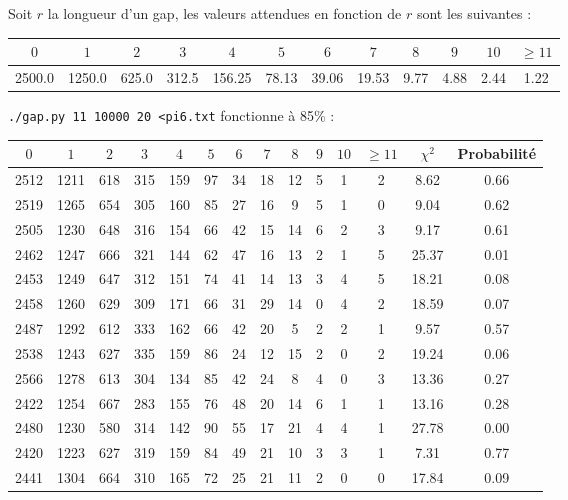 \documentclass[12pt,a4paper]{article}
\begin{document}
Soit $r$ la longueur d'un gap, les valeurs attendues en fonction de $r$ sont les suivantes : 
\begin{center}
\begin{tabular}{|c|c|c|c|c|c|c|c|c|c|c|c|}
\hline
$0$ & $1$ & $2$ & $3$ & $4$ & $5$ & $6$ & $7$ & $8$ & $9$ & $10$ & $\geq 11$\\ \hline
2500.0 & 1250.0 & 625.0 & 312.5 & 156.25 & 78.13 & 39.06 & 19.53 & 9.77 & 4.88 & 2.44 & 1.22\\ \hline
\end{tabular}
\end{center}

\texttt{./gap.py 11 10000 20 <pi6.txt} fonctionne à 85\% :

\begin{center}
\begin{tabular}{|c|c|c|c|c|c|c|c|c|c|c|c|c|c|}
\hline
$0$ & $1$ & $2$ & $3$ & $4$ & $5$ & $6$ & $7$ & $8$ & $9$ & $10$ & $\geq 11$ & $\chi^2$ & Probabilité \\ \hline
2512 & 1211 & 618 & 315 & 159 & 97 & 34 & 18 & 12 & 5 & 1 & 2 &  8.62 &  0.66\\ \hline
2519 & 1265 & 654 & 305 & 160 & 85 & 27 & 16 & 9 & 5 & 1 & 0 &  9.04 &  0.62\\ \hline
2505 & 1230 & 648 & 316 & 154 & 66 & 42 & 15 & 14 & 6 & 2 & 3 &  9.17 &  0.61\\ \hline
2462 & 1247 & 666 & 321 & 144 & 62 & 47 & 16 & 13 & 2 & 1 & 5 & 25.37 &  0.01\\ \hline
2453 & 1249 & 647 & 312 & 151 & 74 & 41 & 14 & 13 & 3 & 4 & 5 & 18.21 &  0.08\\ \hline
2458 & 1260 & 629 & 309 & 171 & 66 & 31 & 29 & 14 & 0 & 4 & 2 & 18.59 &  0.07\\ \hline
2487 & 1292 & 612 & 333 & 162 & 66 & 42 & 20 & 5 & 2 & 2 & 1 &  9.57 &  0.57\\ \hline
2538 & 1243 & 627 & 335 & 159 & 86 & 24 & 12 & 15 & 2 & 0 & 2 & 19.24 &  0.06\\ \hline
2566 & 1278 & 613 & 304 & 134 & 85 & 42 & 24 & 8 & 4 & 0 & 3 & 13.36 &  0.27\\ \hline
2422 & 1254 & 667 & 283 & 155 & 76 & 48 & 20 & 14 & 6 & 1 & 1 & 13.16 &  0.28\\ \hline
2480 & 1230 & 580 & 314 & 142 & 90 & 55 & 17 & 21 & 4 & 4 & 1 & 27.78 &  0.00\\ \hline
2420 & 1223 & 627 & 319 & 159 & 84 & 49 & 21 & 10 & 3 & 3 & 1 &  7.31 &  0.77\\ \hline
2441 & 1304 & 664 & 310 & 165 & 72 & 25 & 21 & 11 & 2 & 0 & 0 & 17.84 &  0.09\\ \hline

\end{tabular}
\end{center}
\end{document}
